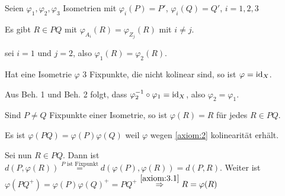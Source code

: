 \begin{beweis}
    Seien $\varphi_1, \varphi_2, \varphi_3$ Isometrien mit
    $\varphi_i(P) = P'$, $\varphi_i(Q) = Q'$, $i=1,2,3$

    \begin{behauptung}
        Es gibt $R \in PQ$ mit $\varphi_{A_i} (R) = \varphi_{Z_j} (R)$
        mit $i \neq j$.

        \Obda sei $i=1$ und $j=2$, also $\varphi_1(R) = \varphi_2(R)$.
    \end{behauptung}
    \begin{behauptung}
        Hat eine Isometrie $\varphi$ 3 Fixpunkte, die nicht kolinear sind,
        so ist $\varphi = \textnormal{id}_X$.

        Aus Beh. 1 und Beh. 2 folgt, dass $\varphi_2^{-1} \circ \varphi_1 = \textnormal{id}_X$,
        also $\varphi_2 = \varphi_1$.
    \end{behauptung}

    \begin{beweis}\leavevmode
        \begin{behauptung}
            Sind $P \neq Q$ Fixpunkte einer Isometrie, so ist 
            $\varphi(R) = R$ für jedes $R \in PQ$.
        \end{behauptung}
        \begin{beweis}
            Es ist $\varphi(PQ) = \varphi(P) \varphi(Q)$ weil $\varphi$
            wegen \ref{axiom:2} kolinearität erhält.

            Sei nun $R \in PQ$. Dann ist $d(P, \varphi(R)) \stackrel{P \text{ ist Fixpunkt}}{=} d(\varphi(P), \varphi(R)) = d(P, R)$.
            Weiter ist $\varphi (PQ^+) = \varphi(P) \varphi(Q)^+ = PQ^+$
            $\stackrel{\ref{axiom:3.1}}{\Rightarrow} R = \varphi(R)$
        \end{beweis}
    \end{beweis}
\end{beweis}
